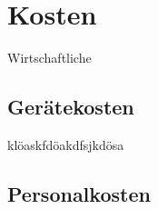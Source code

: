 \chapter{Kosten}
Wirtschaftliche 
\section{Gerätekosten}
klöaskfdöakdfsjkdösa
\section{Personalkosten}